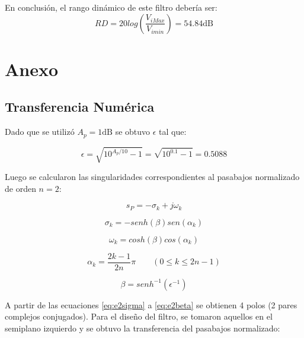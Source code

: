 En conclusión, el rango dinámico de este filtro debería ser:
\begin{equation}
RD = 20 log\left(\frac{V_{i Max}}{V_{i min}} \right)= 54.84 \si{\deci\bel}
\end{equation}

\newpage

\section{Anexo}

\subsection{Transferencia Numérica}

Dado que se utilizó $A_p=1 \si{\deci\bel}$ se obtuvo $\epsilon$ tal que:

\begin{equation}
\epsilon=\sqrt{10^{A_p/10}-1}=\sqrt{10^{0.1}-1} = 0.5088
\end{equation}

Luego se calcularon las singularidades correspondientes al pasabajos normalizado de orden $n=2$:

\begin{equation}
s_P= -\sigma _k  + j \omega _k
\label{eq:e2sing}
\end{equation}

\begin{equation}
\sigma _k=-senh( \beta ) sen(\alpha _k)
\label{eq:e2sigma}
\end{equation}

\begin{equation}
\omega _k=cosh( \beta) cos(\alpha _k)
\label{eq:e2omega}
\end{equation}

\begin{equation}
\alpha_k=\frac{2k-1}{2n}\pi \qquad (0 \leq k \leq 2n-1)
\label{eq:e2alphak}
\end{equation}

\begin{equation}
\beta=senh^{-1}\left( \epsilon^{-1}\right) 
\label{eq:e2beta}
\end{equation}

A partir de las ecuaciones \eqref{eq:e2sigma} a \eqref{eq:e2beta} se obtienen 4 polos (2 pares complejos conjugados). Para el diseño del filtro, se tomaron aquellos en el semiplano izquierdo y se obtuvo la transferencia del pasabajos normalizado:


